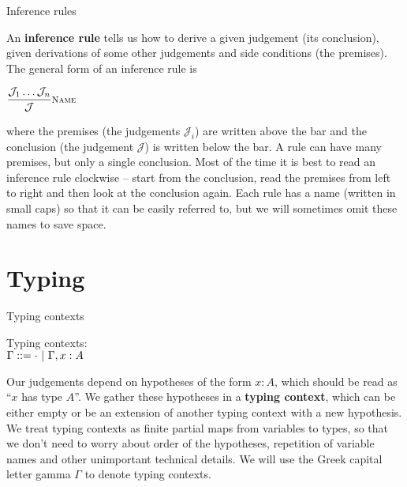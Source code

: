 \documentclass{beamer}
\begin{document}
\begin{frame}{Inference rules}


An \textbf{inference rule} tells us how to derive a given judgement (its conclusion), given derivations of some other judgements and side conditions (the premises). The general form of an inference rule is

\vspace{1em}

\begin{center}
  $\infrule[Name]{\mathcal{J}_1 \dots \mathcal{J}_n}{\mathcal{J}}$
\end{center}

\vspace{1em}

where the premises (the judgements $\mathcal{J}_i$) are written above the bar and the conclusion (the judgement $\mathcal{J}$) is written below the bar. A rule can have many premises, but only a single conclusion. Most of the time it is best to read an inference rule clockwise -- start from the conclusion, read the premises from left to right and then look at the conclusion again. Each rule has a name (written in small caps) so that it can be easily referred to, but we will sometimes omit these names to save space.

\end{frame}

\section{Typing}

\begin{frame}{Typing contexts}

Typing contexts: \\
$\Gamma ::= \emptytypingctx \pipe \extend{\Gamma}{x}{A}$

\vspace{1em}

Our judgements depend on hypotheses of the form $x : A$, which should be read as ``$x$ has type $A$''. We gather these hypotheses in a \textbf{typing context}, which can be either empty or be an extension of another typing context with a new hypothesis. We treat typing contexts as finite partial maps from variables to types, so that we don't need to worry about order of the hypotheses, repetition of variable names and other unimportant technical details. We will use the Greek capital letter gamma $\Gamma$ to denote typing contexts.

\end{frame}
\end{document}
